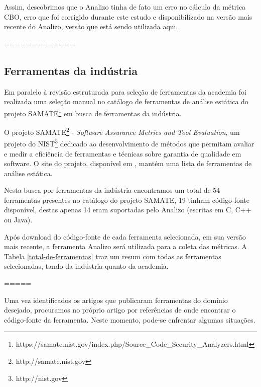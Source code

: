 Assim, descobrimos que o Analizo tinha de fato um erro no cálculo da métrica
CBO, erro que foi corrigido durante este estudo e disponibilizado na versão
mais recente do Analizo, versão que está sendo utilizada aqui.


=============

\subsection{Ferramentas da indústria}

Em paralelo à revisão estruturada para seleção de ferramentas da academia
foi realizada uma seleção manual no catálogo de ferramentas de análise estática do projeto
SAMATE\footnote{https://samate.nist.gov/index.php/Source\_Code\_Security\_Analyzers.html}
em busca de ferramentas da indústria.

O projeto SAMATE\footnote{http://samate.nist.gov} - {\em Software Assurance
Metrics and Tool Evaluation}, um projeto do NIST\footnote{http://nist.gov}
dedicado ao desenvolvimento de métodos que permitam avaliar e medir a
eficiência de ferramentas e técnicas sobre garantia de qualidade em software.
O site do projeto, disponível em , mantém uma lista
de ferramentas de análise estática.

Nesta busca por ferramentas da indústria encontramos um total de 54 ferramentas
presentes no catálogo do projeto SAMATE, 19 tinham código-fonte disponível,
destas apenas 14 eram suportadas pelo Analizo (escritas em C, C++ ou Java).

Após download do código-fonte de cada ferramenta selecionada, em sua versão
mais recente, a ferramenta Analizo será utilizada para a coleta das métricas. 
A Tabela \ref{total-de-ferramentas} traz um resum com todas as ferramentas
selecionadas, tando da indústria quanto da academia.


=====

Uma vez identificados os artigos que publicaram ferramentas do domínio
desejado, procuramos no próprio artigo por referências de onde encontrar o
código-fonte da ferramenta. Neste momento, pode-se enfrentar algumas situações.

